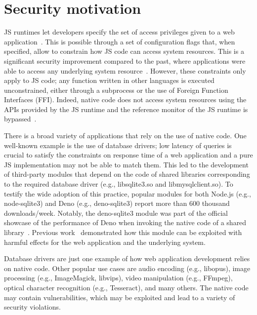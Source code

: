 \section{Security motivation}
\label{sect:sci-ffi}

JS runtimes let developers specify the set of access privileges given
to a web application~\cite{deno-permissions, node-permissions}.  This
is possible through a set of configuration flags that, when specified,
allow to constrain how JS code can access system resources.  This is a
significant security improvement compared to the past, where
applications were able to access any underlying system
resource~\cite{staicu2018synode, 10.5555/3361338.3361407}.  However,
these constraints only apply to JS code; any function written in other
languages is executed unconstrained, either through a subprocess or
the use of Foreign Function Interfaces (FFI).  Indeed, native code
does not access system resources using the APIs provided by the JS
runtime and the reference monitor of the JS runtime is
bypassed~\cite{deno-permissions}.

There is a broad variety of applications that rely on the use of
native code.  One well-known example is the use of database drivers;
low latency of queries is crucial to satisfy the constraints on
response time of a web application and a pure JS implementation may
not be able to match them. This led to the development of third-party
modules that depend on the code of shared libraries corresponding to
the required database driver (e.g., libsqlite3.so and
libmysqlclient.so).  To testify the wide adoption of this practice,
popular modules for both Node.js (e.g.,
node-sqlite3) and Deno (e.g.,
deno-sqlite3) report more than 600 thousand
\mbox{downloads/week}. Notably, the deno-sqlite3 module was part of
the official showcase of the performance of Deno when invoking the
native code of a shared library~\cite{deno-ffi-improvements}. Previous
work~\cite{staicu2021bilingual} demonstrated how this module can be
exploited with harmful effects for the web application and the
underlying system.

Database drivers are just one example of how web application
development relies on native code.  Other popular use cases are audio
encoding (e.g., libopus), image processing (e.g., ImageMagick,
libvips), video manipulation (e.g., FFmpeg), optical character
recognition (e.g., Tesseract), and many others.  The native code may
contain vulnerabilities, which may be exploited and lead to a variety
of security violations.

